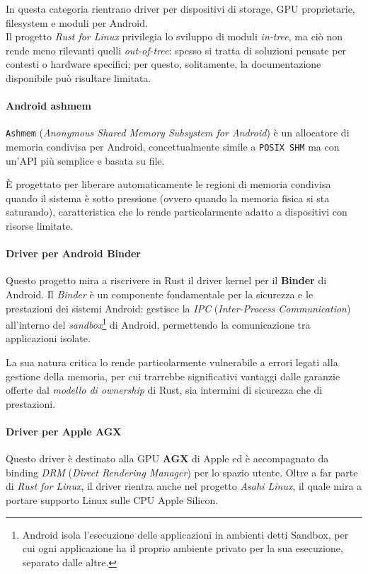 In questa categoria rientrano driver per dispositivi di storage, GPU proprietarie, filesystem e moduli per Android.\hfill
\vspace{7pt}\\
\noindent Il progetto \textit{Rust for Linux} privilegia lo sviluppo di moduli \textit{in-tree}, ma ciò non rende meno rilevanti quelli \textit{out-of-tree}:
spesso si tratta di soluzioni pensate per contesti o hardware specifici; per questo, solitamente, la documentazione disponibile può risultare limitata.

\paragraph{Android ashmem}
\texttt{Ashmem} (\textit{Anonymous Shared Memory Subsystem for Android}) è un allocatore di memoria condivisa per Android, concettualmente simile a 
\texttt{POSIX SHM} ma con un'API più semplice e basata su file.

È progettato per liberare automaticamente le regioni di memoria condivisa quando il sistema è sotto pressione (ovvero quando la memoria fisica si sta saturando), caratteristica che lo rende particolarmente 
adatto a dispositivi con risorse limitate.

\paragraph{Driver per Android Binder}
Questo progetto mira a riscrivere in Rust il driver kernel per il \textbf{Binder} di Android.
Il \textit{Binder} è un componente fondamentale per la sicurezza e le prestazioni dei sistemi Android: gestisce la \textit{IPC} (\textit{Inter-Process Communication}) all'interno 
del \textit{sandbox}\footnote{Android isola l'esecuzione delle applicazioni in ambienti detti Sandbox, per cui ogni applicazione ha il proprio ambiente privato per la sua esecuzione, separato dalle altre.} di Android, permettendo la comunicazione tra applicazioni isolate.

La sua natura critica lo rende particolarmente vulnerabile a errori legati alla gestione della memoria, per cui trarrebbe significativi vantaggi 
dalle garanzie offerte dal \textit{modello di ownership} di Rust, sia intermini di sicurezza che di prestazioni.

\paragraph{Driver per Apple AGX}
Questo driver è destinato alla GPU \textbf{AGX} di Apple ed è accompagnato da binding \textit{DRM} (\textit{Direct Rendering Manager}) per lo spazio utente.
Oltre a far parte di \textit{Rust for Linux}, il driver rientra anche nel progetto \textit{Asahi Linux}, il quale mira a portare supporto Linux sulle 
CPU Apple Silicon.

